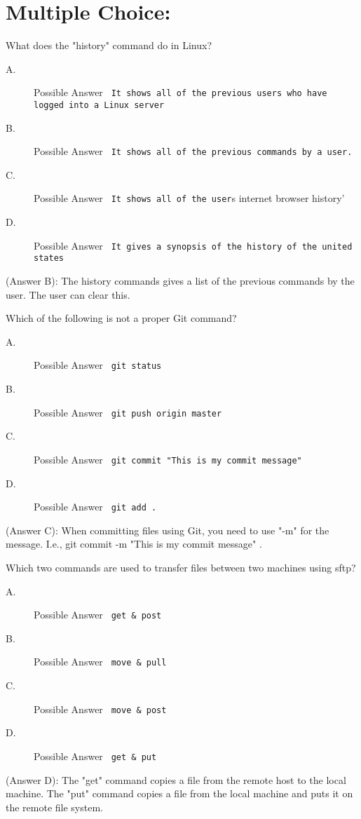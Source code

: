 \documentclass[12pt,answers]{exam}
\begin{document}
\section*{Multiple Choice:}
\begin{questions}
\question What does the "history" command do in Linux?
\begin{description}
\item[A.] Possible Answer \verb' It shows all of the previous users who have logged into a Linux server'
\item[B.] Possible Answer \verb' It shows all of the previous commands by a user.'
\item[C.] Possible Answer \verb' It shows all of the user's internet browser history'   
\item[D.] Possible Answer \verb' It gives a synopsis of the history of the united states'     
\end{description}
\begin{solution}
(Answer B): The history commands gives a list of the previous commands by the user. The user can clear this.  
\end{solution}

\question Which of the following is not a proper Git command?
\begin{description}
\item[A.] Possible Answer \verb' git status'
\item[B.] Possible Answer \verb' git push origin master'
\item[C.] Possible Answer \verb' git commit "This is my commit message"'    
\item[D.] Possible Answer \verb' git add .'     
\end{description}
\begin{solution}
(Answer C): When committing files using Git, you need to use "-m" for the message. I.e., git commit -m "This is my commit message" .  
\end{solution}

\question Which two commands are used to transfer files between two machines using sftp?
\begin{description}
\item[A.] Possible Answer \verb' get & post'
\item[B.] Possible Answer \verb' move & pull'
\item[C.] Possible Answer \verb' move & post'   
\item[D.] Possible Answer \verb' get & put'     
\end{description}
\begin{solution}
(Answer D): The "get" command copies a file from the remote host to the local machine. The "put" command copies a file from the local machine and puts it on the remote file system.  
\end{solution}


\end{questions}
\end{document}
